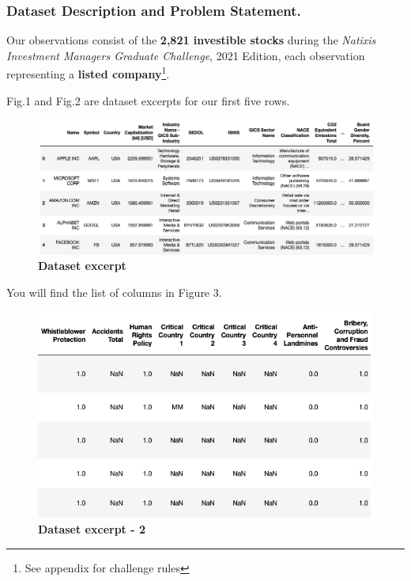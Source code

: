 \documentclass[12pt]{report}
\begin{document}
\subsubsection{Dataset Description and Problem Statement.}
Our observations consist of the \textbf{2,821 investible stocks} during the \textit{Natixis Investment Managers Graduate Challenge}, 2021 Edition, each observation representing a \textbf{listed company}\footnote{See appendix for challenge rules}.\newline

Fig.1 and Fig.2 are dataset excerpts for our first five rows. 

\begin{figure}[h!]
\centering
\includegraphics[scale=0.5]{dataset.png}
\caption{\textbf{Dataset excerpt}}
\label{fig:dataset}
\end{figure}
You will find the list of columns in Figure 3.
\begin{figure}[h!]
\centering
\includegraphics[scale=0.5]{dataset2.png}
\caption{\textbf{Dataset excerpt - 2}}
\label{fig:dataset2}
\end{figure}
 
\end{document}
